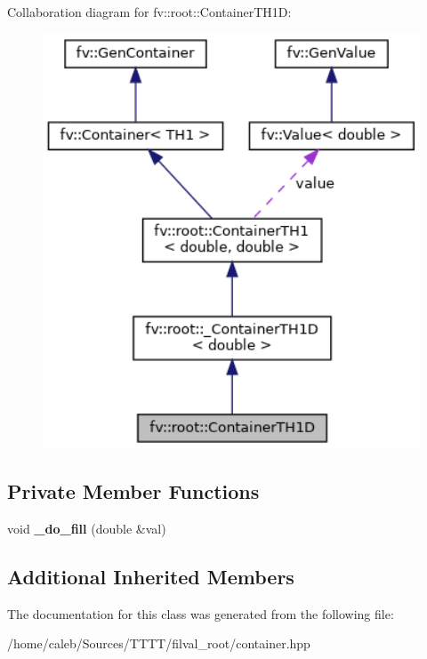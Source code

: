 Collaboration diagram for fv\+:\+:root\+:\+:Container\+T\+H1D\+:
\nopagebreak
\begin{figure}[H]
\begin{center}
\leavevmode
\includegraphics[width=334pt]{classfv_1_1root_1_1ContainerTH1D__coll__graph}
\end{center}
\end{figure}
\subsection*{Private Member Functions}
\begin{DoxyCompactItemize}
\item 
\hypertarget{classfv_1_1root_1_1ContainerTH1D_abdbef4ab1e5c567eb4ef2826df2f283e}{}\label{classfv_1_1root_1_1ContainerTH1D_abdbef4ab1e5c567eb4ef2826df2f283e} 
void {\bfseries \+\_\+do\+\_\+fill} (double \&val)
\end{DoxyCompactItemize}
\subsection*{Additional Inherited Members}


The documentation for this class was generated from the following file\+:\begin{DoxyCompactItemize}
\item 
/home/caleb/\+Sources/\+T\+T\+T\+T/filval\+\_\+root/container.\+hpp\end{DoxyCompactItemize}
